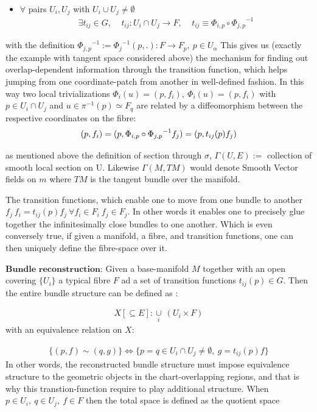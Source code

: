 \documentclass[8pt, twocoloumn]{article}
\begin{document}
\begin{itemize}
\item $\forall$ pairs $U_i, U_j$ with  $U_i \cup U_j \neq \emptyset$ \begin{align}
\exists t_{ij} \in G, \ \ \ \ \ t_{ij}: U_i \cap U_j \to F,  \ \ \ \ \ t_{ij} \equiv \Phi_{i, p} \circ  {\Phi_{j, p}}^{-1}
\end{align}  
\end{itemize}
with the definition ${\Phi_{j, p}}^{-1}:={\Phi_{j}}^{-1}(p, .): F \to F_p, \ p\in U_{\alpha}$ This gives us (exactly the example with tangent space considered above) the mechanism for finding out overlap-dependent information through the transition function, which helps jumping from one coordinate-patch from another in well-defined fashion. In this way two local trivializations $\Phi_i(u)= (p, f_i), \  \Phi_i(u)= (p, f_i)$ with $p \in U_i \cap U_j$ and $u \in \pi^{-1}(p) \simeq F_q$ are related by a diffeomorphism between the respective coordinates on the fibre: 
\begin{align}{\label{amongbundles}}
(p, f_i) =  (p, \Phi_{i, p} \circ  {\Phi_{j, p}}^{-1} f_j) =  (p, t_{ij}(p)f_j)
\end{align}

as mentioned above the definition of section through $\sigma$, $\Gamma(U, E) := $ collection of smooth local section on U. Likewise $\Gamma(M, TM)$ would denote Smooth Vector fields on $m$ where $TM$ is the tangent bundle over the manifold.

The transition functions, which enable one to move from one bundle to another $f_j \ f_i = t_{ij}(p)f_j \ \forall f_i \in F_i \ f_j \in F_j$. In other words it enables one to precisely glue together the infinitesimally close bundles to one another. Which is even conversely true, if given a manifold, a fibre, and transition functions, one can then uniquely define the fibre-space over it.

$\textbf{Bundle reconstruction:}$ Given a base-manifold $M$ together with an open covering $\{U_i\}$ a typical fibre $F$ ad a set of transition functions $t_{ij}(p) \in G$. Then the entire bundle structure can be defined as :

\begin{align}
    X [\subseteq E]: \underset{i}{\cup} \ ( U_i \times F )
\end{align}
with an equivalence relation on $X$:

\begin{align}
    \{(p, f) \sim (q, g)\} \Leftrightarrow \{p=q \in  U_i \cap U_j \neq \emptyset, \ g = t_{ij}(p)f \}
\end{align}
In other words, the reconstructed bundle structure must impose equivalence structure to the geometric objects in the chart-overlapping regions, and that is why this transtion-function require to play additional structure. When $p \in U_i, \ q \in U_j, \ f \in F$ then the total space is defined as the quotient space 
\end{document}
